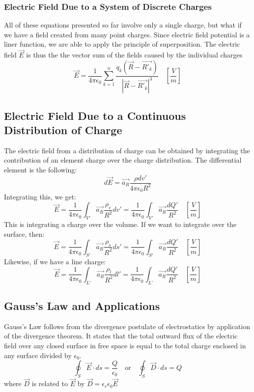 \documentclass[11pt]{article}
\begin{document}
\subsubsection{Electric Field Due to a System of Discrete Charges}
All of these equations presented so far involve only a single charge, but what if we have a field created from many point charges. Since electric field potential is a liner function, we are able to apply the principle of superposition. The electric field $\vec{E}$ is thus the the vector sum of the fields caused by the individual charges
$$ \vec{E} = \frac{1}{4\pi\epsilon_0} \sum_{k=1}^{n} \frac{q_k (\vec{R} - \vec{R'_k})}{ |\vec{R} - \vec{R'_k}|^3} \quad \left[\frac{V}{m}\right]$$

\subsection{Electric Field Due to a Continuous Distribution of Charge}
The electric field from a distribution of charge can be obtained by integrating the contribution of an element charge over the charge distribution. The differential element is the following:
$$ d\vec{E} = \vec{a_R}\frac{\rho dv'}{4\pi \epsilon_0 R^2} $$
Integrating this, we get:
$$ \vec{E} = \frac{1}{4\pi\epsilon_0} \int_{V'} \vec{a_R} \frac{\rho_v}{R^2} dv' =  \frac{1}{4\pi\epsilon_0} \int_{V'} \vec{a_R} \frac{dQ'}{R^2}  	\quad	\left[\frac{V}{m}\right] $$
This is integrating a charge over the volume. If we want to integrate over the surface, then:
$$ \vec{E} = \frac{1}{4\pi\epsilon_0} \int_{S'} \vec{a_R}\frac{\rho_s}{R^2} ds' = \frac{1}{4\pi\epsilon_0} \int_{S'} \vec{a_R}\frac{dQ'}{R^2} 	\quad	 \left[\frac{V}{m}\right] $$
Likewise, if we have a line charge:
$$ \vec{E} = \frac{1}{4\pi\epsilon_0} \int_{L'} \vec{a_R}\frac{\rho_l}{R^2} dl' =  \frac{1}{4\pi\epsilon_0} \int_{L'} \vec{a_R}\frac{dQ'}{R^2}\quad	 \left[\frac{V}{m}\right] $$

\subsection{Gauss's Law and Applications}
Gauss's Law follows from the divergence postulate of electrostatics by application of the divergence theorem. It states that the total outward flux of the electric field over any closed surface in free space is equal to the total charge enclosed in any surface divided by $\epsilon_0$.
$$ \oint_{S} \vec{ E}  \cdot ds = \frac{Q}{\epsilon_0} \quad \text{or} \quad \oint_{S} \vec{ D}  \cdot ds = Q $$
where $\vec{D}$ is related to $\vec{E}$ by $\vec{D} = \epsilon_r \epsilon_0 \vec{E}$
\end{document}
